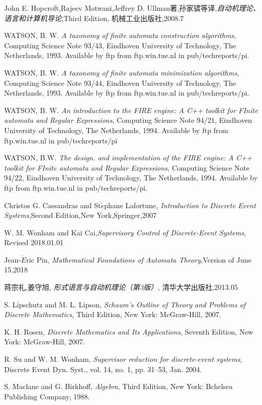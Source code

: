 %

\begin{thebibliography}{99}
	John E. Hopcroft,Rajeev Motwani,Jeffrey D. Ullman著,孙家骕等译,\textit{自动机理论、语言和计算机导论},Third Edition, 机械工业出版社,2008.7
	
	WATSON, B. W. \textit{A taxonomy of finite automata construction algorithms}, Computing Science Note 93/43, Eindhoven University of Technology, The Netherlands, 1993. Available by ftp from ftp.win.tue.nl in pub/techreports/pi.
	
	WATSON, B. W. \textit{A taxonomy of finite automata minimization algorithms}, Computing Science Note 93/44, Eindhoven University of Technology, The Netherlands, 1993. Available by ftp from ftp.win.tue.nl in pub/techreports/pi.
	
	WATSON, B. W. \textit{An introduction to the FIRE engine: A C++ toolkit for FInite automata and Regular Expressions}, Computing Science Note 94/21, Eindhoven University of Technology, The Netherlands, 1994. Available by ftp from ftp.win.tue.nl in pub/techreports/pi
	
	WATSON, B.W. \textit{The design. and implementation of the FIRE engine:	A C++ toolkit for FInite automata and Regular Expressions}, Computing Science Note 94/22, Eindhoven University of Technology, The Netherlands, 1994. Available by ftp from ftp.win.tue.nl in pub/techreports/pi.
	
	Christos G. Cassandras and St$\acute{e}$phane Lafortune, \textit{Introduction to Discrete Event Systems},Second Edition,New York,Springer,2007
	
	W. M. Wonham and Kai Cai,\textit{Supervisory Control of Discrete-Event Systems}, Revised 2018.01.01
	
	Jean-$\acute{E}$ric Pin, \textit{Mathematical Foundations of Automata Theory},Version of June 15,2018
	
	蒋宗礼,姜守旭, \textit{形式语言与自动机理论（第3版）}, 清华大学出版社,2013.05
	
	
	S. Lipschutz and M. L. Lipson, \textit{Schaum's Outline of Theory and Problems of Discrete Mathematics}, Third Edition, New York: McGraw-Hill, 2007.
	
	K. H. Rosen, \textit{Discrete Mathematics and Its Applications}, Seventh Edition, New York: McGraw-Hill, 2007.
	
	R. Su and W. M. Wonham, \textit{Supervisor reduction for discrete-event systems}, Discrete Event Dyn. Syst., vol. 14, no. 1, pp. 31–53, Jan. 2004.
	
	S. Maclane and G. Birkhoff, \textit{Algebra}, Third Edition, New York: Bchelsea Publishing Company, 1988.
\end{thebibliography}

